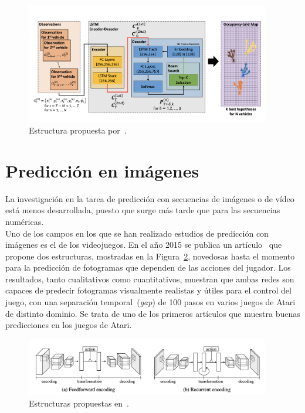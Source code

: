 \vspace{10pt}
\begin{figure}[H]
	\begin{center}
		\includegraphics[width=0.95\textwidth]{ figures/estadoarte/vehicle_trajectory.png}
		\caption{Estructura propuesta por~\cite{vehicletrajectory}.
		}
		\label{fig.vehicletrajectory}
	\end{center}
\end{figure}
\vspace{-10pt}

\section{Predicción en imágenes}
La investigación en la tarea de predicción con secuencias de imágenes o de vídeo está menos desarrollada, puesto que surge más tarde que para las secuencias numéricas.\\

Uno de los campos en los que se han realizado estudios de predicción con imágenes es el de los videojuegos. En el año 2015 se publica un artículo~\cite{actiongames} que propone dos estructuras, mostradas en la Figura~\ref{fig.games_nets}, novedosas hasta el momento para la predicción de fotogramas que dependen de las acciones del jugador. Los resultados, tanto cualitativos como cuantitativos, muestran que ambas redes son capaces de predecir fotogramas visualmente realistas y útiles para el control del juego, con una separación temporal~(\textit{gap}) de 100 pasos en varios juegos de Atari de distinto dominio. Se trata de uno de los primeros artículos que muestra buenas predicciones en los juegos de Atari.\\

\vspace{10pt}
\begin{figure}[H]
	\begin{center}
		\includegraphics[width=0.95\textwidth]{ figures/estadoarte/games_nets.png}
		\caption{Estructuras propuestas en~\cite{actiongames}.
		}
		\label{fig.games_nets}
	\end{center}
\end{figure}
\vspace{-10pt}

